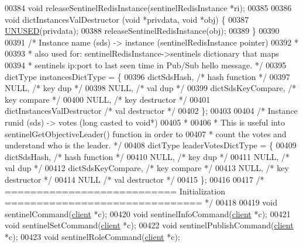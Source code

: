 \begin{DoxyCode}
00384 \textcolor{keywordtype}{void} releaseSentinelRedisInstance(sentinelRedisInstance *ri);
00385 
00386 \textcolor{keywordtype}{void} dictInstancesValDestructor (\textcolor{keywordtype}{void} *privdata, \textcolor{keywordtype}{void} *obj) \{
00387     \hyperlink{server_8h_ae7c9dc8f13568a9c856573751f1ee1ec}{UNUSED}(privdata);
00388     releaseSentinelRedisInstance(obj);
00389 \}
00390 
00391 \textcolor{comment}{/* Instance name (sds) -> instance (sentinelRedisInstance pointer)}
00392 \textcolor{comment}{ *}
00393 \textcolor{comment}{ * also used for: sentinelRedisInstance->sentinels dictionary that maps}
00394 \textcolor{comment}{ * sentinels ip:port to last seen time in Pub/Sub hello message. */}
00395 dictType instancesDictType = \{
00396     dictSdsHash,               \textcolor{comment}{/* hash function */}
00397     NULL,                      \textcolor{comment}{/* key dup */}
00398     NULL,                      \textcolor{comment}{/* val dup */}
00399     dictSdsKeyCompare,         \textcolor{comment}{/* key compare */}
00400     NULL,                      \textcolor{comment}{/* key destructor */}
00401     dictInstancesValDestructor \textcolor{comment}{/* val destructor */}
00402 \};
00403 
00404 \textcolor{comment}{/* Instance runid (sds) -> votes (long casted to void*)}
00405 \textcolor{comment}{ *}
00406 \textcolor{comment}{ * This is useful into sentinelGetObjectiveLeader() function in order to}
00407 \textcolor{comment}{ * count the votes and understand who is the leader. */}
00408 dictType leaderVotesDictType = \{
00409     dictSdsHash,               \textcolor{comment}{/* hash function */}
00410     NULL,                      \textcolor{comment}{/* key dup */}
00411     NULL,                      \textcolor{comment}{/* val dup */}
00412     dictSdsKeyCompare,         \textcolor{comment}{/* key compare */}
00413     NULL,                      \textcolor{comment}{/* key destructor */}
00414     NULL                       \textcolor{comment}{/* val destructor */}
00415 \};
00416 
00417 \textcolor{comment}{/* =========================== Initialization =============================== */}
00418 
00419 \textcolor{keywordtype}{void} sentinelCommand(\hyperlink{structclient}{client} *c);
00420 \textcolor{keywordtype}{void} sentinelInfoCommand(\hyperlink{structclient}{client} *c);
00421 \textcolor{keywordtype}{void} sentinelSetCommand(\hyperlink{structclient}{client} *c);
00422 \textcolor{keywordtype}{void} sentinelPublishCommand(\hyperlink{structclient}{client} *c);
00423 \textcolor{keywordtype}{void} sentinelRoleCommand(\hyperlink{structclient}{client} *c);

\end{DoxyCode}
